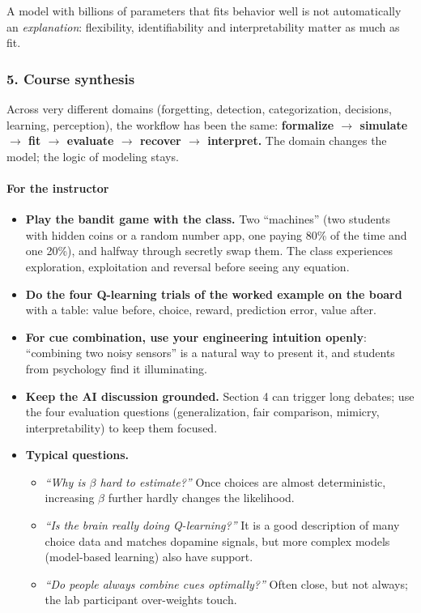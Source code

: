 A model with billions of parameters that fits behavior well is not
automatically an \emph{explanation}: flexibility, identifiability and
interpretability matter as much as fit.

\subsubsection{5. Course synthesis}

Across very different domains (forgetting, detection, categorization,
decisions, learning, perception), the workflow has been the same:
\textbf{formalize \ensuremath{\rightarrow} simulate \ensuremath{\rightarrow} fit \ensuremath{\rightarrow} evaluate \ensuremath{\rightarrow} recover \ensuremath{\rightarrow} interpret.}
The domain changes the model; the logic of modeling stays.

\paragraph{For the instructor}

\begin{itemize}
\tightlist
\item
  \textbf{Play the bandit game with the class.} Two ``machines'' (two
  students with hidden coins or a random number app, one paying 80\% of
  the time and one 20\%), and halfway through secretly swap them. The
  class experiences exploration, exploitation and reversal before seeing
  any equation.
\item
  \textbf{Do the four Q-learning trials of the worked example on the
  board} with a table: value before, choice, reward, prediction error,
  value after.
\item
  \textbf{For cue combination, use your engineering intuition openly}:
  ``combining two noisy sensors'' is a natural way to present it, and
  students from psychology find it illuminating.
\item
  \textbf{Keep the AI discussion grounded.} Section 4 can trigger long
  debates; use the four evaluation questions (generalization, fair
  comparison, mimicry, interpretability) to keep them focused.
\item
  \textbf{Typical questions.}

  \begin{itemize}
  \tightlist
  \item
    \emph{``Why is \(\beta\) hard to estimate?''} Once choices are
    almost deterministic, increasing \(\beta\) further hardly changes
    the likelihood.
  \item
    \emph{``Is the brain really doing Q-learning?''} It is a good
    description of many choice data and matches dopamine signals, but
    more complex models (model-based learning) also have support.
  \item
    \emph{``Do people always combine cues optimally?''} Often close, but
    not always; the lab participant over-weights touch.
  \end{itemize}
\end{itemize}

